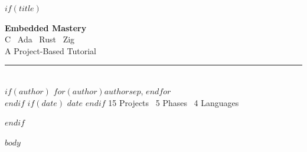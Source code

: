 \documentclass[11pt,openany,twoside]{book}
\begin{document}
$if(title)$
\begin{titlepage}
  \begin{center}
    \vspace*{2cm}
    {\Huge\bfseries\color{secondarycolor} Embedded Mastery}\\[0.5cm]
    {\Large\color{primarycolor} C \textperiodcentered\ Ada \textperiodcentered\ Rust \textperiodcentered\ Zig}\\[1cm]
    {\large A Project-Based Tutorial}\\[2cm]
    \rule{0.5\textwidth}{0.5pt}\\[1cm]
    $if(author)$
    {\large $for(author)$$author$$sep$, $endfor$}\\[0.5cm]
    $endif$
    $if(date)$
    {\normalsize\color{secondarycolor} $date$}
    $endif$
    \vfill
    {\small\color{secondarycolor} 15 Projects \textperiodcentered\ 5 Phases \textperiodcentered\ 4 Languages}
    \vspace{1cm}
  \end{center}
\end{titlepage}
$endif$

\tableofcontents
\clearpage

$body$
\end{document}
